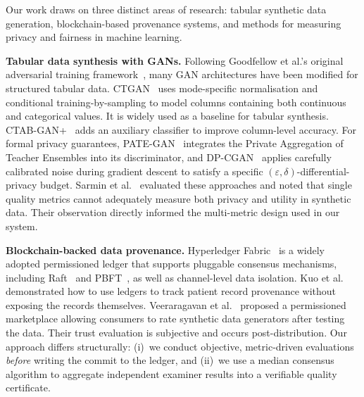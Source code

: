 
Our work draws on three distinct areas of research: tabular synthetic data generation, blockchain-based provenance systems, and methods for measuring privacy and fairness in machine learning.

\textbf{Tabular data synthesis with GANs.}
Following Goodfellow et al.'s original adversarial training framework~\cite{goodfellow2014generative}, many GAN architectures have been modified for structured tabular data. CTGAN~\cite{xu2019ctgan} uses mode-specific normalisation and conditional training-by-sampling to model columns containing both continuous and categorical values. It is widely used as a baseline for tabular synthesis. CTAB-GAN+~\cite{zhao2022ctabgan} adds an auxiliary classifier to improve column-level accuracy. For formal privacy guarantees, PATE-GAN~\cite{jordon2018pate} integrates the Private Aggregation of Teacher Ensembles into its discriminator, and DP-CGAN~\cite{torkzadehmahani2020dp} applies carefully calibrated noise during gradient descent to satisfy a specific $(\varepsilon,\delta)$-differential-privacy budget. Sarmin et al.~\cite{sarmin2024privacy} evaluated these approaches and noted that single quality metrics cannot adequately measure both privacy and utility in synthetic data. Their observation directly informed the multi-metric design used in our system.

\textbf{Blockchain-backed data provenance.}
Hyperledger Fabric~\cite{androulaki2018hyperledger} is a widely adopted permissioned ledger that supports pluggable consensus mechanisms, including Raft~\cite{ongaro2014search} and PBFT~\cite{castro1999practical}, as well as channel-level data isolation. Kuo et al.~\cite{kuo2017blockchain} demonstrated how to use ledgers to track patient record provenance without exposing the records themselves. Veeraragavan et al.~\cite{veeraragavan2024blockchain} proposed a permissioned marketplace allowing consumers to rate synthetic data generators after testing the data. Their trust evaluation is subjective and occurs post-distribution. Our approach differs structurally: (i)~we conduct objective, metric-driven evaluations \emph{before} writing the commit to the ledger, and (ii)~we use a median consensus algorithm to aggregate independent examiner results into a verifiable quality certificate.


